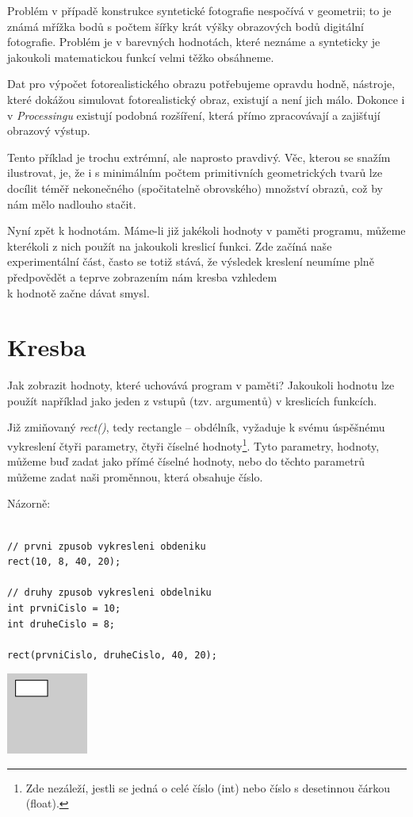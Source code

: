 \documentclass[10pt,twoside=true,open=right,cleardoublepage=empty,chapterprefix=true]{scrbook}
\newcommand{\oddil}[1]{\section{#1}\index{#1}\label{#1}}
\newcommand{\vyraz}[1]{\textit{\gls{#1}}\index{#1}\label{#1}}
\begin{document}
Problém v případě konstrukce syntetické fotografie nespočívá v geometrii; to je známá mřížka bodů s počtem šířky krát výšky obrazových bodů digitální fotografie. Problém je v barevných hodnotách, které neznáme a synteticky je jakoukoli matematickou funkcí velmi těžko obsáhneme.

Dat pro výpočet fotorealistického obrazu potřebujeme opravdu hodně, nástroje, které dokážou simulovat fotorealistický obraz, existují a není jich málo. Dokonce i v {\em Processingu} existují podobná rozšíření, která přímo zpracovávají a zajišťují obrazový výstup.

Tento příklad je trochu extrémní, ale naprosto pravdivý. Věc, kterou se snažím ilustrovat, je, že i s minimálním počtem primitivních geometrických tvarů lze docílit téměř nekonečného (spočitatelně obrovského) množství obrazů, což by nám mělo nadlouho stačit.

Nyní zpět k hodnotám. Máme-li již jakékoli hodnoty v paměti programu, můžeme kterékoli z nich použít na jakoukoli kreslicí funkci. Zde začíná naše experimentální část, často se totiž stává, že výsledek kreslení neumíme plně předpovědět a teprve zobrazením nám kresba vzhledem \\k hodnotě začne dávat smysl.

\oddil{Kresba}

Jak zobrazit hodnoty, které uchovává program v paměti? Jakoukoli hodnotu lze použít například jako jeden z vstupů (tzv. argumentů) v kreslicích funkcích.

Již zmiňovaný \vyraz{rect()}, tedy rectangle -- obdélník, vyžaduje k svému úspěšnému vykreslení čtyři parametry, čtyři číselné hodnoty\footnote{Zde nezáleží, jestli se jedná o celé číslo (int) nebo číslo s desetinnou čárkou (float).}. Tyto parametry, hodnoty, můžeme buď zadat jako přímé číselné hodnoty, nebo do těchto parametrů můžeme zadat naši proměnnou, která obsahuje číslo.

Názorně:

\begin{lstlisting}

// prvni zpusob vykresleni obdeniku
rect(10, 8, 40, 20);

// druhy zpusob vykresleni obdelniku
int prvniCislo = 10;
int druheCislo = 8;

rect(prvniCislo, druheCislo, 40, 20);

\end{lstlisting}


\begin{center}
\includegraphics[width = 0.2\textwidth]{imgs/kresba-1.png}
\end{center}
\end{document}
